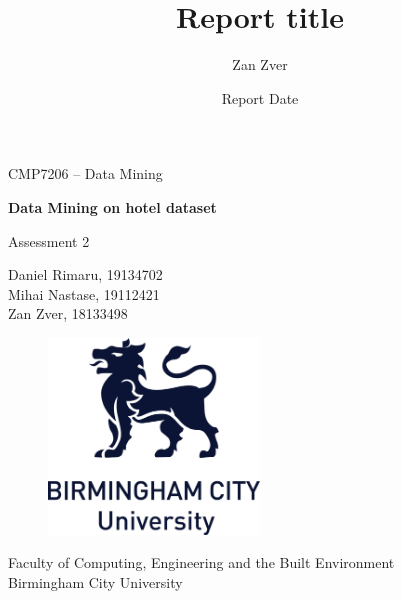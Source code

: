 \documentclass[12pt]{article}
\title{Report title}
\author{Zan Zver}
\date{Report Date }
\newcommand{\authorNameD}{Daniel Rimaru}
\newcommand{\authorIDD}{19134702}
\newcommand{\authorNameM}{Mihai Nastase}
\newcommand{\authorIDM}{19112421}
\newcommand{\authorNameZ}{Zan Zver}
\newcommand{\authorIDZ}{18133498}
\newcommand{\reportTitle}{Data Mining on hotel dataset}
\begin{document}
%
\begin{titlepage}
    \begin{center}
        CMP7206 – Data Mining
        \vspace*{0.5cm}
 
        \huge\textbf{\reportTitle} 
 
        \vspace{0.5cm}
            Assessment 2
        \vspace{1.5cm}

        \authorNameD, \authorIDD \\
        \authorNameM, \authorIDM \\
        \authorNameZ, \authorIDZ
 
        \vfill
             
        \vspace{0.8cm}
      
        \begin{figure}[htp]
         \centering
         \includegraphics[width=0.5\textwidth]{logo}
        \end{figure}
             
        \large{Faculty of Computing, Engineering and the Built Environment \\
        Birmingham City University \\}
             
    \end{center}
\end{titlepage}

\pagestyle{fancy}
\fancyhf{}
\setlength{\headsep}{50pt}
\end{document}
